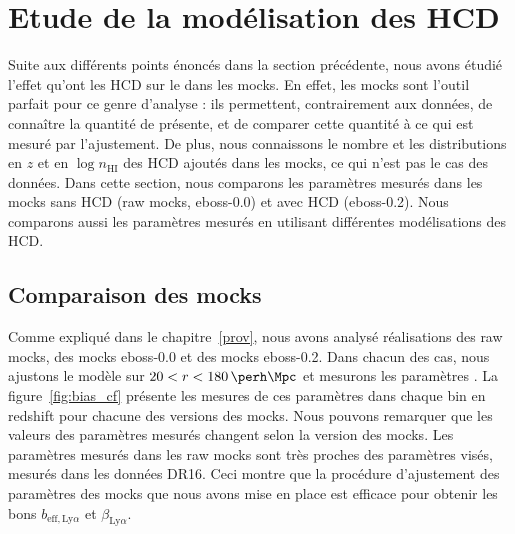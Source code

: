 \documentclass[11pt, twoside, a4paper, openright]{report}
\begin{document}
\section{Etude de la modélisation des HCD}
\label{sec:etude_model_hcd}
Suite aux différents points énoncés dans la section précédente, nous avons étudié l'effet qu'ont les HCD sur le \lya{} dans les mocks.
En effet, les mocks sont l'outil parfait pour ce genre d'analyse : ils permettent, contrairement aux données, de connaître la quantité de \lya{} présente, et de comparer cette quantité à ce qui est mesuré par l'ajustement. De plus, nous connaissons le nombre et les distributions en $z$ et en $\log n_{\mathrm{HI}}$ des HCD ajoutés dans les mocks, ce qui n'est pas le cas des données.
Dans cette section, nous comparons les paramètres \lya{} mesurés dans les mocks sans HCD (raw mocks, eboss-0.0) et avec HCD (eboss-0.2). Nous comparons aussi les paramètres \lya{} mesurés en utilisant différentes modélisations des HCD.

\subsection{Comparaison des mocks}
\label{subsec:comparaison_mocks}
Comme expliqué dans le chapitre~\ref{prov}, nous avons analysé \Nmocks{} réalisations des raw mocks, des mocks eboss-0.0 et des mocks eboss-0.2.
Dans chacun des cas, nous ajustons le modèle sur $20 < r < \SI{180}{\perh\Mpc}$ et mesurons les paramètres \lya{}.
La figure~\ref{fig:bias_cf} présente les mesures de ces paramètres dans chaque bin en redshift pour chacune des versions des mocks.
Nous pouvons remarquer que les valeurs des paramètres \lya{} mesurés changent selon la version des mocks.
Les paramètres mesurés dans les raw mocks sont très proches des paramètres visés, mesurés dans les données DR16. Ceci montre que la procédure d'ajustement des paramètres des mocks que nous avons mise en place est efficace pour obtenir les bons $b_{\mathrm{eff},\mathrm{Ly}\alpha}$ et $\beta_{\mathrm{Ly}\alpha}$.
\end{document}
